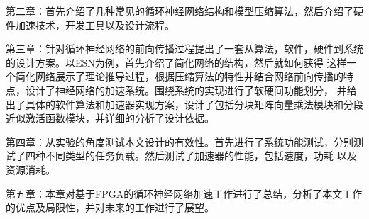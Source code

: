 第二章：首先介绍了几种常见的循环神经网络结构和模型压缩算法，然后介绍了硬件加速技术，开发工具以及设计流程。

第三章：针对循环神经网络的前向传播过程提出了一套从算法，软件，硬件到系统的设计方案。以ESN为例，首先介绍了简化网络的结构，然后就如何获得
这样一个简化网络展示了理论推导过程，根据压缩算法的特性并结合网络前向传播的特点，设计了神经网络的加速系统。围绕系统的实现进行了软硬间功能划分，
并给出了具体的软件算法和加速器实现方案，设计了包括分块矩阵向量乘法模块和分段近似激活函数模块，并详细的分析了设计依据。

第四章：从实验的角度测试本文设计的有效性。首先进行了系统功能测试，分别测试了四种不同类型的任务负载。然后测试了加速器的性能，包括速度，功耗
以及资源消耗。

第五章：本章对基于FPGA的循环神经网络加速工作进行了总结，分析了本文工作的优点及局限性，并对未来的工作进行了展望。

%
%
%
%
%
%
%
%
%
%
%
%
%
